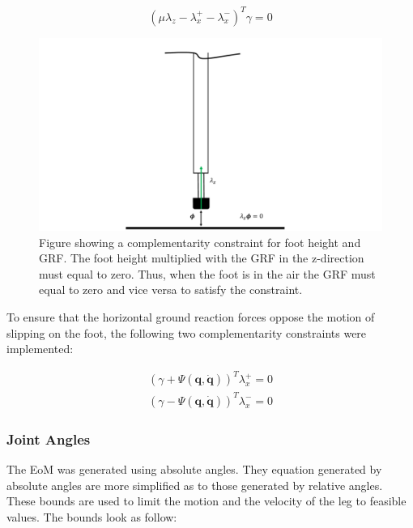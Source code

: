        \begin{equation}
            (\mu \lambda_z - \lambda^+_x - \lambda^-_x)^T \gamma = 0
        \end{equation}
        
        \begin{figure}[ht]
            \centering
            \includegraphics[width=\textwidth]{figs/grf}
            \caption{Figure showing a complementarity constraint for foot height and GRF. The foot height multiplied with the GRF in the z-direction must equal to zero. Thus, when the foot is in the air the GRF must equal to zero and vice versa to satisfy the constraint.}
            \label{fig:grf}
        \end{figure}
        
        To ensure that the horizontal ground reaction forces oppose the motion of slipping on the foot, the following two complementarity constraints were implemented:
        
        \begin{equation}
            \begin{split}
                (\gamma + \Psi(\bm{q}, \dot{\bm{q}}))^T \lambda^+_x = 0 \\
                (\gamma - \Psi(\bm{q}, \dot{\bm{q}}))^T \lambda^-_x = 0
            \end{split}
        \end{equation}
        
        \subsubsection{Joint Angles}
        The EoM was generated using absolute angles. They equation generated by absolute angles are more simplified as to those generated by relative angles. These bounds are used to limit the motion and the velocity of the leg to feasible values. The bounds look as follow:
        
